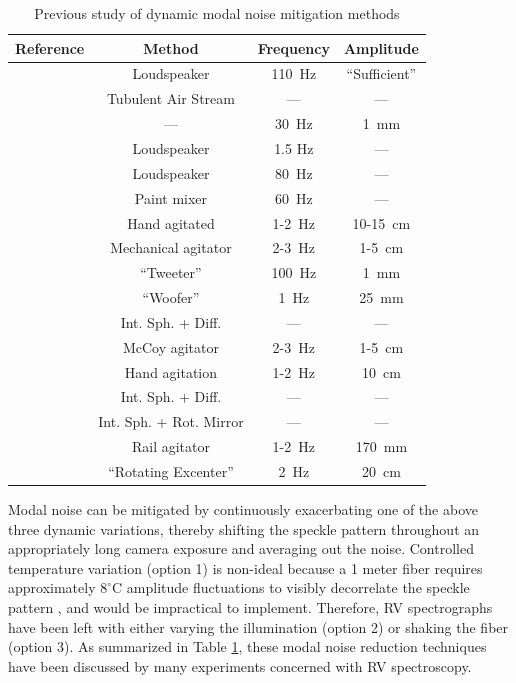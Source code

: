 \documentclass[twocolumn]{emulateapj}
\begin{document}
\begin{table}
\centering
\caption{Previous study of dynamic modal noise mitigation methods}
	\begin{tabular}{cccc}
		\hline
		Reference & Method & Frequency & Amplitude \\
		\hline\hline
		\citet{Daino1980} & Loudspeaker & \SI{110}{\hertz} & ``Sufficient'' \\
		\hline
		\citet{Hill1980} & Tubulent Air Stream & --- & --- \\
		\hline
		\citet{Baudrand2001} & --- & \SI{30}{\hertz} & \SI{1}{\milli\meter} \\
		\hline
		\multirow{2}{*}{\citet{Lemke2011}} & Loudspeaker & 1.5 Hz & --- \\
		 & Loudspeaker & \SI{80}{\hertz} & --- \\
		\hline
		\multirow{3}{*}{\citet{McCoy2012}} & Paint mixer & \SI{60}{\hertz} & --- \\
		 & Hand agitated & 1-\SI{2}{\hertz} & 10-\SI{15}{\centi\meter} \\
		 & Mechanical agitator & 2-\SI{3}{\hertz} & 1-\SI{5}{\centi\meter} \\
		\hline
		\multirow{2}{*}{\citet{Plavchan2013}} & ``Tweeter'' & \SI{100}{\hertz} & \SI{1}{\milli\meter} \\
		 & ``Woofer'' & \SI{1}{\hertz} & \SI{25}{\milli\meter} \\
		\hline
		\multirow{3}{*}{\citet{Mahadevan2014}} & Int. Sph. + Diff. & --- & ---\\
		 & McCoy agitator & 2-\SI{3}{\hertz} & 1-\SI{5}{\centi\meter} \\
		 & Hand agitation & 1-\SI{2}{\hertz} & \SI{10}{\centi\meter} \\
		\hline
		\multirow{2}{*}{\citet{Halverson2014}} & Int. Sph. + Diff. & --- & --- \\
		 & Int. Sph. + Rot. Mirror & --- & --- \\
		\hline		
		\citet{Roy2014} & Rail agitator & 1-\SI{2}{\hertz} & \SI{170}{\milli\meter} \\
		\hline
		\citet{Sablowski2015} & ``Rotating Excenter''& \SI{2}{\hertz} & \SI{20}{\centi\meter} \\
		\hline
	\end{tabular}
\label{table:previous_studies}
\end{table}

Modal noise can be mitigated by continuously exacerbating one of the above three dynamic variations, thereby shifting the speckle pattern throughout an appropriately long camera exposure and averaging out the noise. Controlled temperature variation (option 1) is non-ideal because a 1 meter fiber requires approximately $8 ^\circ \mathrm{C}$ amplitude fluctuations to visibly decorrelate the speckle pattern \citep{Redding2013}, and would be impractical to implement. Therefore, RV spectrographs have been left with either varying the illumination (option 2) or shaking the fiber (option 3). As summarized in Table \ref{table:previous_studies}, these modal noise reduction techniques have been discussed by many experiments concerned with RV spectroscopy.
\end{document}
